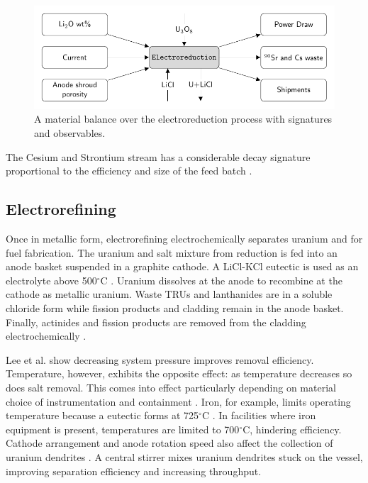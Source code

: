 \documentclass{anstrans}
\begin{document}
\begin{figure}[ht]
	\centering
	\includegraphics[width=\linewidth]{reduction}
	\caption{A material balance over the electroreduction process with signatures and observables.}
	\label{fig:reduction}
\end{figure}

The Cesium and Strontium stream has a considerable decay signature proportional to the efficiency and size of the feed batch \cite{Borrelli_2017,flowsheet_1998}.

\subsection{Electrorefining}

Once in metallic form, electrorefining electrochemically separates uranium and  for fuel fabrication.
The uranium and salt mixture from reduction is fed into an anode basket suspended in a graphite cathode. 
A LiCl-KCl eutectic is used as an electrolyte above 500$^{\circ}$C \cite{flowsheet_1998,lee_korean_2011}. 
Uranium dissolves at the anode to recombine at the cathode as metallic uranium.
Waste \glspl{TRU} and lanthanides are in a soluble chloride form  while fission products and cladding remain in the anode
basket. Finally, actinides and fission products are removed from the cladding electrochemically \cite{lee_korean_2011}.

Lee et al. \cite{lee_advanced_2008} show decreasing system pressure improves removal efficiency. 
Temperature, however, exhibits the opposite effect: as temperature decreases so does salt removal. This comes into effect 
particularly depending on material choice of instrumentation and containment \cite{lee_advanced_2008}. 
Iron, for example, limits operating temperature because a eutectic forms at 725$^{\circ}$C \cite{chapman_revision_1984}.
In facilities where iron equipment is present, temperatures are limited to 700$^{\circ}$C, hindering efficiency. 
Cathode arrangement and anode rotation speed also affect the collection of uranium 
dendrites \cite{lee_advanced_2008}. A central stirrer mixes uranium dendrites stuck on 
the vessel, improving separation efficiency and increasing throughput. 
\end{document}

